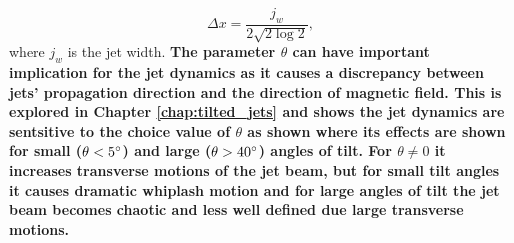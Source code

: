 \begin{equation}
\Delta x = \dfrac{j_w}{2 \sqrt{2 \log{2}}},
\end{equation}
where $j_w$ is the jet width. \textbf{The parameter $\theta$ can have important implication for the jet dynamics as it causes a discrepancy between jets' propagation direction and the direction of magnetic field. This is explored in Chapter \ref{chap:tilted_jets} and shows the jet dynamics are sentsitive to the choice value of $\theta$ as shown where its effects are shown for small ($\theta<5^{\circ}$)  and large ($\theta>40^{\circ}$) angles of tilt. For $\theta\neq0$ it increases transverse motions of the jet beam, but for small tilt angles it causes dramatic whiplash motion and for large angles of tilt the jet beam becomes chaotic and less well defined due large transverse motions.} 